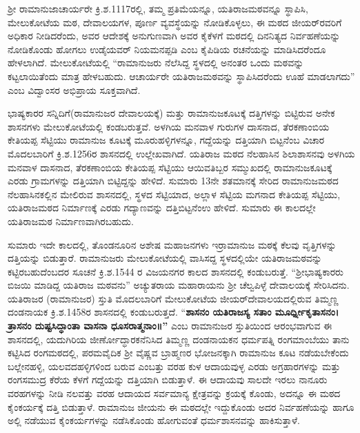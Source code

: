 ಶ‍್ರೀ ರಾಮಾನುಜಾಚಾರ್ಯರೇ ಕ್ರಿ.ಶ.1117ರಲ್ಲಿ, ತಮ್ಮ ಪ್ರತಿಮೆಯನ್ನೂ, ಯತಿರಾಜಮಠವನ್ನೂ ಸ್ಥಾಪಿಸಿ, ಮೇಲುಕೋಟೆಯ ಮಠ, ದೇವಾಲಯಗಳ, ಪೂರ್ಣ ವ್ಯವಸ್ಥೆಯನ್ನು ನೋಡಿಕೊಳ್ಳಲು, ಈ ಮಠದ ಜೀಯರ್​ರವರಿಗೆ ಅಧಿಕಾರ ನೀಡಿದರೆಂದು, ಅವರ ಆದೇಶಕ್ಕೆ ಅನುಗುಣವಾಗಿ ಅವರ ಕೈಕೆಳಗೆ ಮಠದಲ್ಲಿ ದಿನನಿತ್ಯದ ನಿರ್ವಹಣೆಯನ್ನು ನೋಡಿಕೊಂಡು ಹೋಗಲು ಉಡೈಯವರ್​ ನಿಯಮನಪ್ಪಡಿ ಎಂಬ ಕೈಪಿಡಿಯ ರಚನೆಯನ್ನು ಮಾಡಿಸಿದರೆಂದೂ ಹೇಳಲಾಗಿದೆ. ಮೇಲುಕೋಟೆಯಲ್ಲಿ “ರಾಮಾನುಜರು ನೆಲೆಸಿದ್ದ ಸ್ಥಳದಲ್ಲಿ ಅನಂತರ ಒಂದು ಮಠವನ್ನು ಕಟ್ಟಲಾಯಿತೆಂದು ಮಾತ್ರ ಹೇಳಬಹುದು. ಆಚಾರ್ಯರೇ ಯತಿರಾಜಮಠವನ್ನು ಸ್ಥಾಪಿಸಿದರೆಂದು ಊಹೆ ಮಾಡಲಾಗದು” ಎಂಬ ವಿದ್ವಾಂಸರ ಅಭಿಪ್ರಾಯ ಸೂಕ್ತವಾಗಿದೆ.

ಭಾಷ್ಯಕಾರರ ಸನ್ನಿದಿಗೆ(ರಾಮಾನುಜರ ದೇವಾಲಯಕ್ಕೆ) ಮತ್ತು ರಾಮಾನುಜಕೂಟಕ್ಕೆ ದತ್ತಿಗಳನ್ನು ಬಿಟ್ಟಿರುವ ಅನೇಕ ಶಾಸನಗಳು ಮೇಲುಕೋಟೆಯಲ್ಲಿ ಕಂಡಬರುತ್ತವೆ. ಅಳಗಿಯ ಮನವಾಳ ಗುರುಗಳ ದಾಸನಾದ, ತೆರಕಣಾಂಬಿಯ ಕೇತಿಯಪ್ಪ ಸೆಟ್ಟಿಯು ರಾಮಾನುಜ ಕೂಟಕ್ಕೆ ಮೂರುಹಳ್ಳಿಗಳನ್ನೂ, ಗದ್ದೆಯನ್ನು ದತ್ತಿಯಾಗಿ ಬಿಟ್ಟನೆಂಬ ವಿಚಾರ ಮೊದಲಬಾರಿಗೆ ಕ್ರಿ.ಶ.1256ರ ಶಾಸನದಲ್ಲಿ ಉಲ್ಲೇಖವಾಗಿದೆ. ಯತಿರಾಜ ಮಠದ ನೆಲಹಾಸಿನ ಶಿಲಾಶಾಸನವು ಅಳಗಿಯ ಮನವಾಳ ದಾಸನಾದ, ತೆರಕಣಾಂಬಿಯ ಕೇತಿಯಪ್ಪ ಸೆಟ್ಟಿಯು ಆಯಿವತಿಬ್ಬರ ಸಮ್ಮುಖದಲ್ಲಿ ರಾಮಾನುಜಕೂಟಕ್ಕೆ ಎರಡು ಗ್ರಾಮಗಳನ್ನು ದತ್ತಿಯಾಗಿ ಬಿಟ್ಟಿದ್ದನ್ನು ಹೇಳಿದೆ. ಸುಮಾರು 13ನೇ ಶತಮಾನಕ್ಕೆ ಸೇರಿದ ರಾಮಾನುಜಮಠದ ನೆಲಹಾಸಿನಕಲ್ಲಿನ ಮೇಲಿರುವ ಶಾಸನದಲ್ಲಿ, ಸ್ಥಳದ ಸೆಟ್ಟಿಯಾದ, ಅಲ್ಲಾಳ ಸೆಟ್ಟಿಯ ಮಗನಾದ ಕೇತಿಯಪ್ಪ ಸೆಟ್ಟಿಯು, ಯತಿರಾಜಮಠದ ನಿರ್ಮಾಣಕ್ಕೆ ಎರಡು ಗದ್ಯಾಣವನ್ನು ದತ್ತಿಬಿಟ್ಟನೆಂಉ ಹೇಳಿದೆ. ಸುಮಾರು ಈ ಕಾಲದಲ್ಲೇ ಯತಿರಾಜಮಠ ನಿರ್ಮಾಣವಾಗಿರಬಹುದು.

ಸುಮಾರು ಇದೇ ಕಾಲದಲ್ಲಿ, ತೊಂಡನೂರಿನ ಅಶೇಷ ಮಹಾಜನಗಳು ಇರ್ರಾಮಾನುಜ ಮಠಕ್ಕೆ ಕೆಲವು ವೃತ್ತಿಗಳನ್ನು ದತ್ತಿಯನ್ನು ಬಿಡುತ್ತಾರೆ. ರಾಮಾನುಜರು ಮೇಲುಕೋಟೆಯಲ್ಲಿ ವಾಸಿಸದ್ದ ಸ್ಥಳದಲ್ಲಿಯೇ ಯತಿರಾಜಮಠವನ್ನು ಕಟ್ಟಿರಬಹುದೆಂಬದರ ಸೂಚನೆ ಕ್ರಿ.ಶ.1544 ರ ವಿಜಯನಗರ ಕಾಲದ ಶಾಸನದಲ್ಲಿ ಕಂಡುಬರುತ್ತೆ. “ಶ‍್ರೀಭಾಷ್ಯಕಾರರು ಬಿಜಯಿ ಮಾಡಿದ್ದ ಯತಿರಾಜ ಮಠವನು” ಅಚ್ಯುತರಾಯ ಮಹಾರಾಯನು ಶ‍್ರೀ ಚೆಲ್ವಪಿಳ್ಳೆ ದೇವಾಲಯಕ್ಕೆ ಸೇರಿಸಿದನು. ಯತಿರಾಜರ (ರಾಮಾನುಜರ) ಸ್ತುತಿ ಮೊದಲಬಾರಿಗೆ ಮೇಲುಕೋಟೆಯ ಜೀಯರ್​ ದೇವಾಲಯದಲ್ಲಿರುವ ತಿಮ್ಮಣ್ಣ ದಂಡನಾಯಕ ಕ್ರಿ.ಶ.1458ರ ಶಾಸನದಲ್ಲಿ ಕಂಡುಬರುತ್ತದೆ. “\textbf{ಶಾಸನಂ ಯತಿರಾಜಸ್ಯ ಸತಾಂ ಮೂರ್ಧ್ನೀಕೃತಾಸನಂ। ತ್ರಾಸನಂ ದುಷ್ಟಸಿದ್ಧಾಂತಾ ವಾಸನಾ ಧೂಸರಾತ್ಮನಾಂ॥”} ಎಂಬ ರಾಮಾನುಜರ ಸ್ತುತಿಯಿಂದ ಆರಂಭವಾಗುವ ಈ ಶಾಸನದಲ್ಲಿ, ಯದುಗಿರಿಯ ಜೀರ್ಣೋದ್ಧಾರಕನೆನಿಸಿದ ತಿಮ್ಮಣ್ಣ ದಂಡನಾಯಕನ ಧರ್ಮಪತ್ನಿ ರಂಗಮಾಂಬೆಯು ತಾನು ಕಟ್ಟಿಸಿದ ರಂಗಮಠದಲ್ಲಿ, ಪರಮವೈದಿಕ ಶ‍್ರೀ ವೈಷ್ಣವ ಬ್ರಾಹ್ಮಣರ ಭೋಜನಕ್ಕಾಗಿ ರಾಮಾನುಜ ಕೂಟ ನಡೆಯಬೇಕೆಂದು ಬಲ್ಲೇನಹಳ್ಳಿ, ಯಲವದಹಳ್ಳಿಗಳಿಂದ ಬರುವ ಎಂಬತ್ತು ವರಹ ಕುಳ ಆದಾಯವುಳ್ಳ ಎರಡು ಅಗ್ರಹಾರಗಳನ್ನು ಮತ್ತು ರಂಗಸಮುದ್ರ ಕೆರೆಯ ಕೆಳಗೆ ಗದ್ದೆಯನ್ನು ದತ್ತಿಯಾಗಿ ಬಿಡುತ್ತಾಳೆ. ಈ ಆದಾಯವು ಸಾಲದೇ ಇರಲು ನಾನೂರು ವರಹಗಳನ್ನು ನೀಡಿ ನಲವತ್ತು ವರಹ ಆದಾಯದ ಸರ್ವಮಾನ್ಯ ಕ್ಷೇತ್ರವನ್ನು ಕ್ರಯಕ್ಕೆ ಕೊಂಡು, ಅದನ್ನೂ ಈ ಮಠದ ಕೈಂಕರ್ಯಕ್ಕೆ ದತ್ತಿ ಬಿಡುತ್ತಾಳೆ. ರಾಮಾನುಜ ಜೀಯನು ಈ ಮಠದಲ್ಲೇ ಇದ್ದುಕೊಂಡು ಅದರ ನಿರ್ವಹಣೆಯನ್ನು ಹಾಗೂ ಅಲ್ಲಿ ನಡೆಯುವ ಕೈಂಕರ್ಯಗಳನ್ನು ನಡೆಸಿಕೊಂಡು ಹೋಗುವಂತೆ ಧರ್ಮಶಾಸನವನ್ನು ಹಾಕಿಸುತ್ತಾಳೆ.

